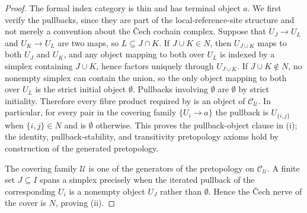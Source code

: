 \begin{proof}
The formal index category is thin and has terminal object $a$. We first
verify the pullbacks, since they are part of the local-reference-site
structure and not merely a convention about the \v{C}ech cochain complex.
Suppose that \(U_J\to U_L\) and \(U_K\to U_L\) are two maps, so
\(L\subseteq J\cap K\). If \(J\cup K\in N\), then \(U_{J\cup K}\) maps to
both \(U_J\) and \(U_K\), and any object mapping to both over \(U_L\) is
indexed by a simplex containing \(J\cup K\), hence factors uniquely through
\(U_{J\cup K}\). If \(J\cup K\notin N\), no nonempty simplex can contain the
union, so the only object mapping to both over \(U_L\) is the strict initial
object \(\emptyset\). Pullbacks involving \(\emptyset\) are \(\emptyset\) by
strict initiality. Therefore every fibre product required by
 is an object of \(\mathcal C_{\mathcal U}\).
In particular, for every pair in the covering family \(\{U_i\to a\}\) the
pullback is \(U_{\{i,j\}}\) when \(\{i,j\}\in N\) and is \(\emptyset\)
otherwise. This proves the pullback-object clause in \textup{(i)}; the
identity, pullback-stability, and transitivity pretopology axioms hold by
construction of the generated pretopology.

The covering family $\mathcal U$ is one of the generators of the
pretopology on $\mathcal C_{\mathcal U}$. A finite set $J\subseteq I$
spans a simplex precisely when the iterated pullback of the corresponding
$U_i$ is a nonempty object $U_J$ rather than $\emptyset$. Hence the
\v{C}ech nerve of the cover is $N$, proving \textup{(ii)}.


\end{proof}
